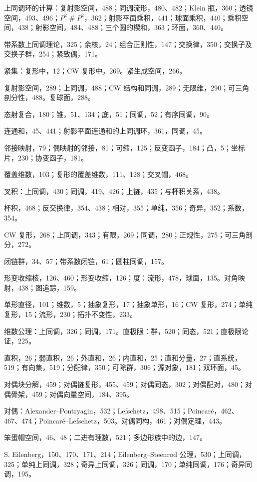 上同调环的计算：复射影空间，488；同调流形，480、482；Klein 瓶，360；透镜空间，493、496；$P^2\mathbin{\#}P^2$，362；射影平面乘积，441；球面乘积，440；乘积空间，438；射影空间，484、488；三个圆的楔和，363；环面，360、440。

带系数上同调理论，325；余核，24；组合正则性，147；交换律，350；交换子及交换子群，254；紧致偶，171。

紧集：复形中，12；CW 复形中，269。紧生成空间，266。

复射影空间，289；上同调，488；CW 结构和同调，289；无限维，290；可三角剖分性，488。复球面，288。

态射复合，180；锥，51、134；底，51；同调，52；有序同调，90。

连通和，45、441；射影平面连通和的上同调环，361，同调，45。

邻接映射，79；偶映射的邻接，81；可缩，125；反变函子，184；凸，5；坐标片，230；协变函子，181。

覆盖维数，103；复形的覆盖维数，111、128；交叉帽，468。

叉积：上同调，430；同调，419、426；上链，435；与杯积关系，438。

杯积，468；反交换律，354、438；相对，355；单纯，356；奇异，352；系数，354。

CW 复形，268；上同调，343；有限，269；同调，280；正规性，275；可三角剖分，272。

闭链群，34、57；带系数闭链，61；圆柱同调，157。

形变收缩核，126、460；形变收缩，126；度：流形，478，球面，135。对角映射，438；图追踪，159。

单形直径，101；维数，5；抽象复形，17；抽象单形，16；CW 复形，274；单纯复形，15；流形，230；拓扑不变性，233。

维数公理：上同调，326；同调，171。直极限：群，520；同态，521；直极限论证，225。

直积，26；弱直积，26；外直和，26；内直和，25；直和分量，27；直系统，519；有向集，519；分配律，350；可除群，306；源对象，181；双环面，45。

对偶块分解，459；对偶链复形，455、459；对偶同态，302；对偶配对，480；对偶骨架，459；对偶向量空间，184、395。

对偶：Alexander--Pontryagin，532；Lefschetz，498、515；Poincaré，462、467、474；Poincaré--Lefschetz，503。对偶同构，461；对偶定理，443。

笨蛋帽空间，46、48；二进有理数，521；多边形族中的边，147。

S. Eilenberg，150、170、171、214；Eilenberg--Steenrod 公理，530；上同调，325；单纯上同调，328；奇异上同调，326；同调，170；单纯同调，176；奇异同调，195。

